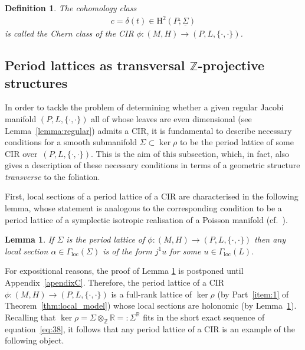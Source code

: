 \documentclass[pdftex]{sigma}
\numberwithin{equation}{section}
\newtheorem{Lemma}[Theorem]{Lemma}
\newtheorem{Definition}[Theorem]{Definition}
\newcommand{\JM}{(P,L,\{\cdot,\cdot\})} %
\newcommand{\CM}{(M,H)} %
\newcommand{\HH}{\mathrm{H}}
\newcommand{\RR}{\mathbb{R}}
\newcommand{\ZZ}{\mathbb{Z}}
\begin{document}
\begin{Definition}\label{defn:cc}
 The cohomology class
 \begin{gather*}
 c = \delta(t) \in \HH^2(P;\underline{\Sigma})
 \end{gather*}
is called the {\it Chern class} of the CIR $\phi \colon \CM \to \JM$.
\end{Definition}

\subsection{Period lattices as transversal $\ZZ$-projective structures}\label{sec:period-lattices-as}
In order to tackle the problem of determining whether a given regular Jacobi mani\-fold $\JM\!$ all of whose leaves are even dimensional (see Lemma~\eqref{lemma:regular}) admits a CIR, it is fundamental to describe necessary conditions for a smooth submanifold $\Sigma \subset \ker \rho$ to be the period lattice of some CIR over~$\JM$. This is the aim of this subsection, which, in fact, also gives a description of these necessary conditions in terms of a geometric structure {\em transverse} to the foliation.

First, local sections of a period lattice of a CIR are characterised in the following lemma, whose statement is analogous to the corresponding condition to be a period lattice of a symplectic isotropic realisation of a Poisson manifold (cf.\ \cite[Corollaire~1]{dd}).

\begin{Lemma}\label{cor:sections_period}
If $\Sigma$ is the period lattice of $\phi \colon \CM \to \JM$ then any local section $\alpha \in \Gamma_{\mathrm{loc}}(\Sigma)$ is of the form $j^1 u$ for some $u \in \Gamma_{\mathrm{loc}}(L)$.
\end{Lemma}

For expositional reasons, the proof of Lemma \ref{cor:sections_period} is postponed until Appendix~\ref{apendixC}. Therefore, the period lattice of a CIR $\phi \colon \CM \to \JM$ is a full-rank lattice of $\ker \rho$ (by Part~\ref{item:1} of Theorem~\ref{thm:local_model}) whose local sections are holonomic (by Lemma~\ref{cor:sections_period}). Recalling that $\ker \rho = \Sigma \otimes_{\ZZ} \RR=: \Sigma^{\RR}$ f\/its in the short exact sequence of equation~\eqref{eq:38}, it follows that any period lattice of a CIR is an example of the following object.
\end{document}
